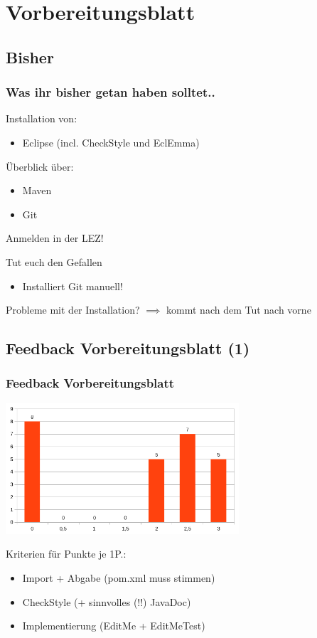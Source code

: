 \documentclass[18pt]{beamer}
\begin{document}
\section{Vorbereitungsblatt}
	\subsection{Bisher}
	\begin{frame}
		\frametitle{Was ihr bisher getan haben solltet..}
		Installation von:
		\begin{itemize}
			\item Eclipse (incl. CheckStyle und EclEmma)
		\end{itemize}
		Überblick über:
		\begin{itemize}
			\item Maven
			\item Git
		\end{itemize}
		Anmelden in der LEZ!
		\begin{alertblock}{Tut euch den Gefallen}
			\begin{itemize}
				\item Installiert Git manuell!
			\end{itemize}
		\end{alertblock}
		Probleme mit der Installation? $\implies$ kommt nach dem Tut nach vorne
	\end{frame}
		
	\subsection{Feedback Vorbereitungsblatt (1)}	
	\begin{frame}
		\frametitle{Feedback Vorbereitungsblatt}
		\includegraphics[width=0.65\textwidth, scale=0.8]{./pics/tut0/points-prep-sheet.png}
		\begin{block}{Kriterien für Punkte}
			je 1P.:
			\begin{itemize}
				\item Import + Abgabe (pom.xml muss stimmen)
				\item CheckStyle (+ sinnvolles (!!) JavaDoc)
				\item Implementierung (EditMe + EditMeTest)
			\end{itemize}
		\end{block}
	\end{frame}
	
\end{document}
